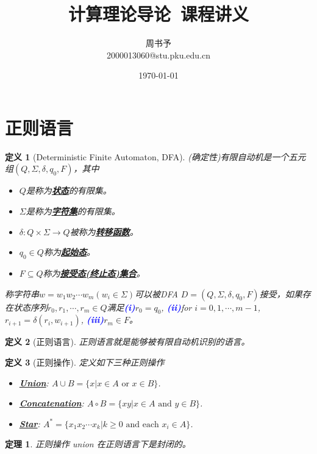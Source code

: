 \documentclass[8pt]{article}
\title{\heiti\zihao{1} 计算理论导论\ 课程讲义}
\author{\kaishu\zihao{-3} 周书予\\2000013060@stu.pku.edu.cn}
\date{\today}
\theoremstyle{compact}
\newtheorem{theorem}{定理}
\newtheorem{definition}{定义}
\def\obj#1{\textbf{\uline{#1}}}
\def\num#1{\textnormal{\textbf{\mbox{\textcolor{blue}{(#1)}}}}}
\def\ge{\geqslant}
\begin{document}
\pagestyle{fancy}


\maketitle

\section{正则语言}
\begin{definition}[Deterministic Finite Automaton, DFA]
	(确定性)有限自动机是一个五元组$(Q, \Sigma, \delta, q_0, F)$，其中
	\begin{itemize}
		\item $Q$是称为\obj{状态}的有限集。
		\item $\Sigma$是称为\obj{字符集}的有限集。
		\item $\delta: Q \times \Sigma \to Q$被称为\obj{转移函数}。
		\item $q_0 \in Q$称为\obj{起始态}。
		\item $F \subseteq Q$称为\obj{接受态(终止态)集合}。
	\end{itemize}

	称字符串$w = w_1w_2\cdots w_m(w_i \in \Sigma)$可以被DFA $D = (Q, \Sigma, \delta, q_0, F)$接受，如果存在状态序列$r_0, r_1, \cdots, r_m \in Q$满足\num{i}$r_0 = q_0$, \num{ii}for $i = 0, 1, \cdots, m-1$, $r_{i+1} = \delta(r_i, w_{i+1})$, \num{iii}$r_m \in F$。
\end{definition}
\begin{definition}[正则语言]
	正则语言就是能够被有限自动机识别的语言。
\end{definition}
\begin{definition}[正则操作]
	定义如下三种正则操作
	\begin{itemize}
		\item \obj{Union}: $A \cup B = \{x | x \in A \textrm{ or } x \in B\}$.
		\item \obj{Concatenation}: $A \circ B = \{xy | x \in A \textrm{ and } y \in B\}$.
		\item \obj{Star}: $A^* = \{x_1x_2\cdots x_k | k \ge 0 \textrm{ and each } x_i \in A\}$.
	\end{itemize}
\end{definition}
\iffalse
\begin{theorem}
	正则操作 union 在正则语言下是封闭的。
\end{theorem}
\end{document}
